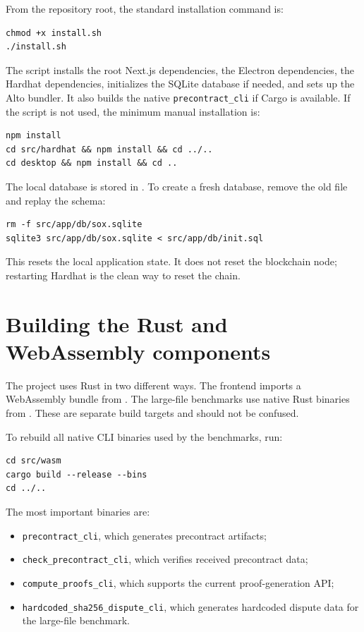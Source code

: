 From the repository root, the standard installation command is:

\begin{verbatim}
chmod +x install.sh
./install.sh
\end{verbatim}

The script installs the root Next.js dependencies, the Electron dependencies, the Hardhat
dependencies, initializes the SQLite database if needed, and sets up the Alto bundler. It
also builds the native \texttt{precontract\_cli} if Cargo is available. If the script is
not used, the minimum manual installation is:

\begin{verbatim}
npm install
cd src/hardhat && npm install && cd ../..
cd desktop && npm install && cd ..
\end{verbatim}

The local database is stored in . To create a fresh database,
remove the old file and replay the schema:

\begin{verbatim}
rm -f src/app/db/sox.sqlite
sqlite3 src/app/db/sox.sqlite < src/app/db/init.sql
\end{verbatim}

This resets the local application state. It does not reset the blockchain node; restarting
Hardhat is the clean way to reset the chain.

\section{Building the Rust and WebAssembly components}

The project uses Rust in two different ways. The frontend imports a WebAssembly bundle from
. The large-file benchmarks use native Rust binaries from
. These are separate build targets and should not be
confused.

To rebuild all native CLI binaries used by the benchmarks, run:

\begin{verbatim}
cd src/wasm
cargo build --release --bins
cd ../..
\end{verbatim}

The most important binaries are:

\begin{itemize}
  \item \texttt{precontract\_cli}, which generates precontract artifacts;
  \item \texttt{check\_precontract\_cli}, which verifies received precontract data;
  \item \texttt{compute\_proofs\_cli}, which supports the current proof-generation API;
  \item \texttt{hardcoded\_sha256\_dispute\_cli}, which generates hardcoded dispute data
  for the large-file benchmark.
\end{itemize}

